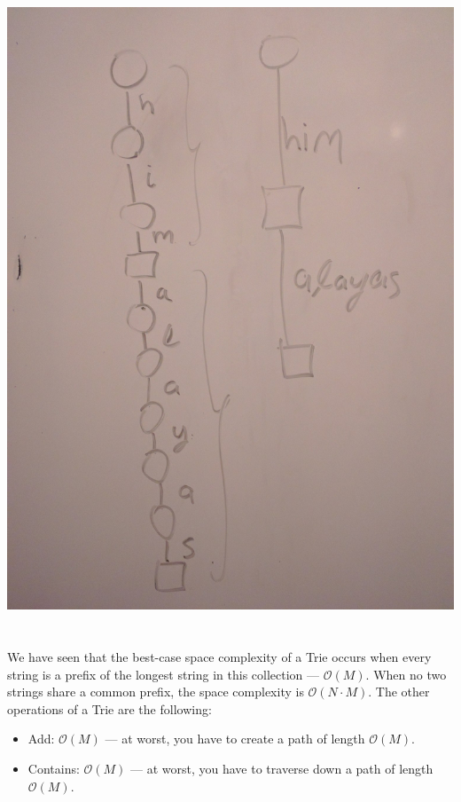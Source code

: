 \documentclass[a4paper,12pt]{article}
\begin{document}
~\\~\\
\includegraphics[scale=0.1]{fig_wasteful}
~\\~\\

\noindent
We have seen that the best-case space complexity of a Trie occurs when every string is a prefix of the longest string in this collection --- $\mathcal{O}(M)$. When no two strings share a common prefix, the space complexity is $\mathcal{O}(N \cdot M)$. The other operations of a Trie are the following:

\begin{itemize}
	\item Add: $\mathcal{O}(M)$ --- at worst, you have to create a path of length $\mathcal{O}(M)$.
	\item Contains: $\mathcal{O}(M)$ --- at worst, you have to traverse down a path of length $\mathcal{O}(M)$.
\end{itemize}
\end{document}

